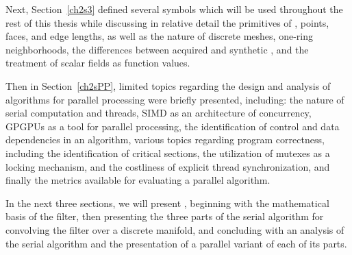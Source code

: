 Next, Section~\ref{ch2s3} defined several symbols which will be used throughout the rest of this thesis while discussing in relative detail the primitives of \tdd{}, points, faces, and edge lengths, as well as the nature of discrete meshes, one-ring neighborhoods, the differences between acquired and synthetic \tdd{}, and the treatment of scalar fields as function values.

Then in Section~\ref{ch2sPP}, limited topics regarding the design and analysis of algorithms for parallel processing were briefly presented, including: the nature of serial computation and threads, SIMD as an architecture of concurrency, GPGPUs as a tool for parallel processing, the identification of control and data dependencies in an algorithm, various topics regarding program correctness, including the identification of critical sections, the utilization of mutexes as a locking mechanism, and the costliness of explicit thread synchronization, and finally the metrics available for evaluating a parallel algorithm.

In the next three sections, we will present , beginning with the mathematical basis of the filter, then presenting the three parts of the serial algorithm for convolving the filter over a discrete manifold, and concluding with an analysis of the serial algorithm and the presentation of a parallel variant of each of its parts.

